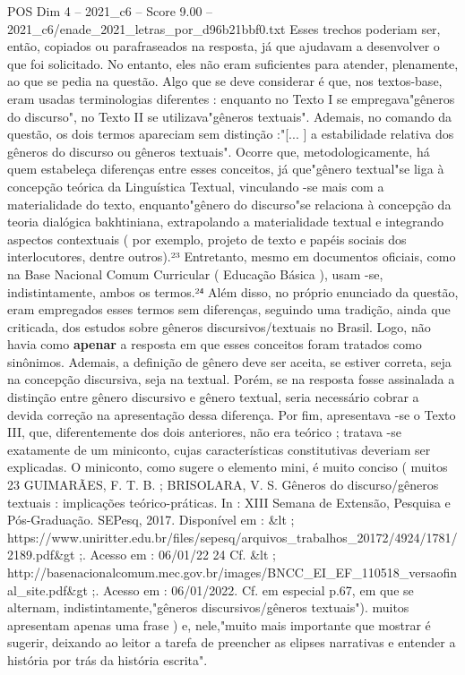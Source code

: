 \begin{textsample}{POS Dim 4 – 2021\_c6 – Score 9.00 – 2021\_c6/enade\_2021\_letras\_por\_d96b21bbf0.txt}
Esses trechos poderiam ser, então, copiados ou parafraseados na resposta, já que ajudavam a desenvolver o que foi solicitado.
No entanto, eles não eram suficientes para atender, plenamente, ao que se pedia na questão.
Algo que se deve considerar é que, nos textos-base, eram usadas terminologias diferentes : enquanto no Texto I se empregava"gêneros do discurso", no Texto II se utilizava"gêneros textuais".
Ademais, no comando da questão, os dois termos apareciam sem distinção :"[... ] a estabilidade relativa dos gêneros do discurso ou gêneros textuais".
Ocorre que, metodologicamente, há quem estabeleça diferenças entre esses conceitos, já que"gênero textual"se liga à concepção teórica da Linguística Textual, vinculando -se mais com a materialidade do texto, enquanto"gênero do discurso"se relaciona à concepção da teoria dialógica bakhtiniana, extrapolando a materialidade textual e integrando aspectos contextuais ( por exemplo, projeto de texto e papéis sociais dos interlocutores, dentre outros).²³ Entretanto, mesmo em documentos oficiais, como na Base Nacional Comum Curricular ( Educação Básica ), usam -se, indistintamente, ambos os termos.²⁴ Além disso, no próprio enunciado da questão, eram empregados esses termos sem diferenças, seguindo uma tradição, ainda que criticada, dos estudos sobre gêneros discursivos/textuais no Brasil.
Logo, não havia como \textbf{apenar} a resposta em que esses conceitos foram tratados como sinônimos.
Ademais, a definição de gênero deve ser aceita, se estiver correta, seja na concepção discursiva, seja na textual.
Porém, se na resposta fosse assinalada a distinção entre gênero discursivo e gênero textual, seria necessário cobrar a devida correção na apresentação dessa diferença.
Por fim, apresentava -se o Texto III, que, diferentemente dos dois anteriores, não era teórico ; tratava -se exatamente de um miniconto, cujas características constitutivas deveriam ser explicadas.
O miniconto, como sugere o elemento mini, é muito conciso ( muitos 23 GUIMARÃES, F.
T.
B. ; BRISOLARA, V.
S.
Gêneros do discurso/gêneros textuais : implicações teórico-práticas.
In : XIII Semana de Extensão, Pesquisa e Pós-Graduação.
SEPesq, 2017.
Disponível em : \&lt ; https://www.uniritter.edu.br/files/sepesq/arquivos\_trabalhos\_20172/4924/1781/2189.pdf\&gt ;.
Acesso em : 06/01/22 24 Cf. \&lt ; http://basenacionalcomum.mec.gov.br/images/BNCC\_EI\_EF\_110518\_versaofinal\_site.pdf\&gt ;.
Acesso em : 06/01/2022.
Cf. em especial p.67, em que se alternam, indistintamente,"gêneros discursivos/gêneros textuais"). muitos apresentam apenas uma frase ) e, nele,"muito mais importante que mostrar é sugerir, deixando ao leitor a tarefa de preencher as elipses narrativas e entender a história por trás da história escrita".

\end{textsample}
